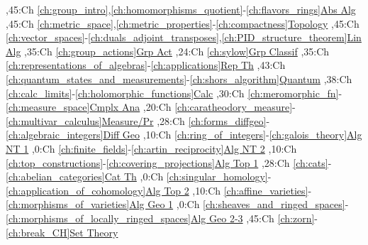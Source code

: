 
\bgroup
\renewcommand{\href}[1]{} %
\hypersetup{linkcolor=black} %
\renewcommand{\solidwidth}{0.7pt}
\renewcommand{\boldwidth}{1.5pt}

\setcounter{diagheight}{50}
\begin{chart}
,45:{Ch \ref*{ch:group_intro},\ref*{ch:homomorphisms_quotient}-\ref*{ch:flavors_rings}}{\hyperref[part:absalg]{Abs Alg}}{}
,45:{Ch \ref*{ch:metric_space},\ref*{ch:metric_properties}-\ref*{ch:compactness}}{\hyperref[part:basictop]{Topology}}{}
,45:{Ch \ref*{ch:vector_spaces}-\ref*{ch:duals_adjoint_transposes},\ref*{ch:PID_structure_theorem}}{\hyperref[part:linalg]{Lin Alg}}{}
,35:{Ch \ref*{ch:group_actions}}{\hyperref[part:groups]{Grp Act}}{}
,24:{Ch \ref*{ch:sylow}}{\hyperref[ch:sylow]{Grp Classif}}{}
,35:{Ch \ref*{ch:representations_of_algebras}-\ref*{ch:applications}}{\hyperref[part:repth]{Rep Th}}{}
,43:{Ch \ref*{ch:quantum_states_and_measurements}-\ref*{ch:shors_algorithm}}{\hyperref[part:quantum]{Quantum}}{}
,38:{Ch \ref*{ch:calc_limits}-\ref*{ch:holomorphic_functions}}{\hyperref[part:calc]{Calc}}{}
,30:{Ch \ref*{ch:meromorphic_fn}-\ref*{ch:measure_space}}{\hyperref[part:cmplxana]{Cmplx Ana}}{}
,20:{Ch \ref*{ch:caratheodory_measure}-\ref*{ch:multivar_calculus}}{\hyperref[part:measure]{Measure/Pr}}{}
,28:{Ch \ref*{ch:forms_diffgeo}-\ref*{ch:algebraic_integers}}{\hyperref[part:diffgeo]{Diff Geo}}{}
,10:{Ch \ref*{ch:ring_of_integers}-\ref*{ch:galois_theory}}{\hyperref[part:algnt1]{Alg NT 1}}{}
,0:{Ch \ref*{ch:finite_fields}-\ref*{ch:artin_reciprocity}}{\hyperref[part:algnt2]{Alg NT 2}}{}
,10:{Ch \ref*{ch:top_constructions}-\ref*{ch:covering_projections}}{\hyperref[part:algtop1]{Alg Top 1}}{}
,28:{Ch \ref*{ch:cats}-\ref*{ch:abelian_categories}}{\hyperref[part:cats]{Cat Th}}{}
,0:{Ch \ref*{ch:singular_homology}-\ref*{ch:application_of_cohomology}}{\hyperref[part:algtop2]{Alg Top 2}}{}
,10:{Ch \ref*{ch:affine_varieties}-\ref*{ch:morphisms_of_varieties}}{\hyperref[part:ag1]{Alg Geo 1}}{}
,0:{Ch \ref*{ch:sheaves_and_ringed_spaces}-\ref*{ch:morphisms_of_locally_ringed_spaces}}{\hyperref[part:ag2]{Alg Geo 2-3}}{}
,45:{Ch \ref*{ch:zorn}-\ref*{ch:break_CH}}{\hyperref[part:st1]{Set Theory}}{}


\end{chart}
